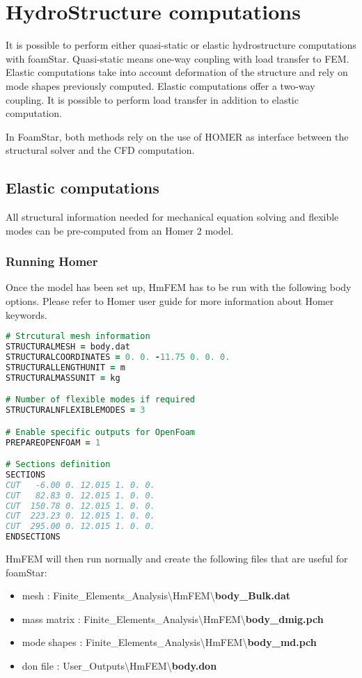 \chapter{HydroStructure computations}
\label{homer}

It is possible to perform either quasi-static or elastic hydrostructure computations with foamStar. Quasi-static means one-way coupling with load transfer to FEM. Elastic computations take into account deformation of the structure and rely on mode shapes previously computed. Elastic computations offer a two-way coupling. It is possible to perform load transfer in addition to elastic computation.

In FoamStar, both methods rely on the use of HOMER as interface between the structural solver and the CFD computation.


\section{Elastic computations}

All structural information needed for mechanical equation solving and flexible modes can be pre-computed from an Homer 2 model.

\subsection{Running Homer}
Once the model has been set up, HmFEM has to be run with the following body options. Please refer to Homer user guide for more information about Homer keywords.

\begin{lstlisting}[language=fortran]
# Strcutural mesh information
STRUCTURALMESH = body.dat
STRUCTURALCOORDINATES = 0. 0. -11.75 0. 0. 0.
STRUCTURALLENGTHUNIT = m
STRUCTURALMASSUNIT = kg

# Number of flexible modes if required
STRUCTURALNFLEXIBLEMODES = 3

# Enable specific outputs for OpenFoam
PREPAREOPENFOAM = 1

# Sections definition
SECTIONS
CUT   -6.00 0. 12.015 1. 0. 0.
CUT   82.83 0. 12.015 1. 0. 0.
CUT  150.78 0. 12.015 1. 0. 0.
CUT  223.23 0. 12.015 1. 0. 0.
CUT  295.00 0. 12.015 1. 0. 0.
ENDSECTIONS
\end{lstlisting}

HmFEM will then run normally and create the following files that are useful for foamStar:
\begin{itemize}
\item mesh : Finite\_Elements\_Analysis{\textbackslash}HmFEM{\textbackslash}\textbf{body\_Bulk.dat}
\item mass matrix : Finite\_Elements\_Analysis{\textbackslash}HmFEM{\textbackslash}\textbf{body\_dmig.pch}
\item mode shapes : Finite\_Elements\_Analysis{\textbackslash}HmFEM{\textbackslash}\textbf{body\_md.pch}
\item don file : User\_Outputs{\textbackslash}HmFEM{\textbackslash}\textbf{body.don}
\end{itemize}

